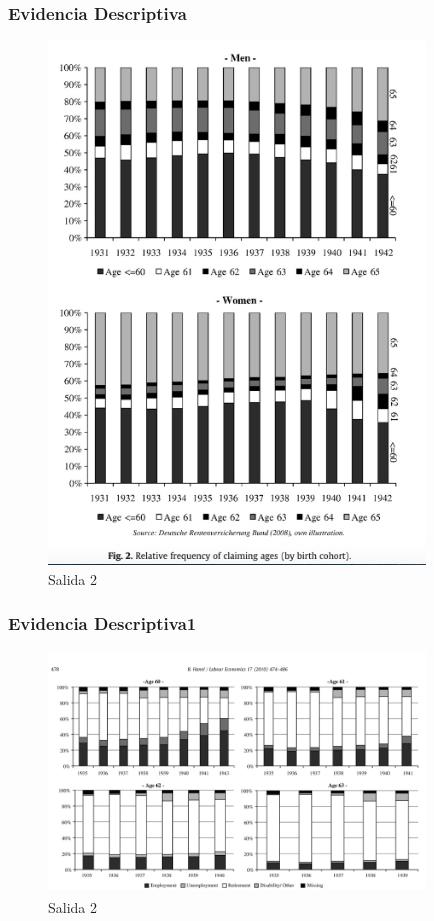 \documentclass{beamer}
\begin{document}
  \frame
  {
    \frametitle{Evidencia Descriptiva}
      \begin{figure}[htp]
        \centering
        \includegraphics[width=10cm]{imgs/hanel10-fig2}
        \caption{Salida 2}
        \label{fig:fig2}
      \end{figure}
  }
  \frame
  {
    \frametitle{Evidencia Descriptiva1}
      \begin{figure}[htp]
        \centering
        \includegraphics[width=10cm]{imgs/hanel10-fig3}
        \caption{Salida 2}
        \label{fig:fig2}
      \end{figure}
  }
  \frame
\end{document}
